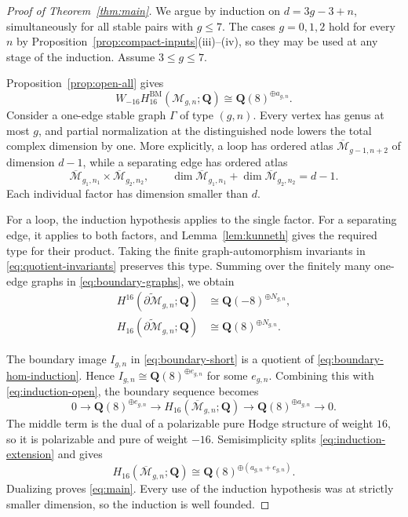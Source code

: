 \documentclass[12pt,reqno]{amsart}
\newcommand{\Q}{\mathbf{Q}}
\newcommand{\M}{\mathcal{M}}
\newcommand{\Mbar}{\overline{\mathcal{M}}}
\newcommand{\BM}{\mathrm{BM}}
\theoremstyle{definition}
\theoremstyle{remark}
\begin{document}
\begin{proof}[Proof of Theorem~\ref{thm:main}]
We argue by induction on $d=3g-3+n$, simultaneously for all stable pairs
with $g\leq7$.  The cases $g=0,1,2$ hold for every $n$ by
Proposition~\ref{prop:compact-inputs}(iii)--(iv), so they may be used at any
stage of the induction.  Assume $3\leq g\leq7$.

Proposition~\ref{prop:open-all} gives
\begin{equation}\label{eq:induction-open}
 W_{-16}H_{16}^{\BM}(\M_{g,n};\Q)
 \cong\Q(8)^{\oplus a_{g,n}}.
\end{equation}
Consider a one-edge stable graph $\Gamma$ of type $(g,n)$.  Every vertex
has genus at most $g$, and partial normalization at the distinguished node
lowers the total complex dimension by one.  More explicitly, a loop has
ordered atlas $\Mbar_{g-1,n+2}$ of dimension $d-1$, while a separating edge
has ordered atlas
\[
 \Mbar_{g_1,n_1}\times\Mbar_{g_2,n_2},
 \qquad
 \dim\Mbar_{g_1,n_1}+\dim\Mbar_{g_2,n_2}=d-1.
\]
Each individual factor has dimension smaller than $d$.

For a loop, the induction hypothesis applies to the single factor.  For a
separating edge, it applies to both factors, and
Lemma~\ref{lem:kunneth} gives the required type for their product.  Taking
the finite graph-automorphism invariants in
\eqref{eq:quotient-invariants} preserves this type.  Summing over the
finitely many one-edge graphs in \eqref{eq:boundary-graphs}, we obtain
\begin{align}
 H^{16}(\widetilde{\partial\M}_{g,n};\Q)
   &\cong\Q(-8)^{\oplus N_{g,n}},
   \label{eq:boundary-cohom-induction}\\
 H_{16}(\widetilde{\partial\M}_{g,n};\Q)
   &\cong\Q(8)^{\oplus N_{g,n}}.
   \label{eq:boundary-hom-induction}
\end{align}

The boundary image $I_{g,n}$ in \eqref{eq:boundary-short} is a quotient of
\eqref{eq:boundary-hom-induction}.  Hence
$I_{g,n}\cong\Q(8)^{\oplus e_{g,n}}$ for some $e_{g,n}$.  Combining this
with \eqref{eq:induction-open}, the boundary sequence becomes
\begin{equation}\label{eq:induction-extension}
 0\longrightarrow\Q(8)^{\oplus e_{g,n}}
 \longrightarrow H_{16}(\Mbar_{g,n};\Q)
 \longrightarrow\Q(8)^{\oplus a_{g,n}}
 \longrightarrow0.
\end{equation}
The middle term is the dual of a polarizable pure Hodge structure of weight
$16$, so it is polarizable and pure of weight $-16$.  Semisimplicity splits
\eqref{eq:induction-extension} and gives
\[
 H_{16}(\Mbar_{g,n};\Q)
 \cong\Q(8)^{\oplus(a_{g,n}+e_{g,n})}.
\]
Dualizing proves \eqref{eq:main}.  Every use of the induction hypothesis was
at strictly smaller dimension, so the induction is well founded.
\end{proof}
\end{document}
